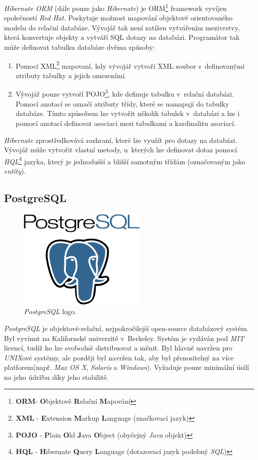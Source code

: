 \emph{Hibernate ORM} (dále pouze jako \emph{Hibernate}) je ORM\footnote{\textbf{ORM}- \textbf{O}bjektově \textbf{R}elační \textbf{M}apování} framework vyvíjen společností \emph{Red Hat}.
Poskytuje možnost mapování objektově orientovaného modelu do relační databáze.
Vývojář tak není zatížen vytvářením mezivrstvy, která konvertuje objekty a vytváří SQL dotazy na databázi.
Programátor tak může definovat tabulku databáze dvěma způsoby:
\begin{enumerate}
  \item Pomocí XML\footnote{\textbf{XML} - \textbf{E}xtension \textbf{M}arkup \textbf{L}anguage (značkovací jazyk)} mapovaní, kdy vývojář vytvoří XML soubor s~definovanými atributy tabulky a jejich omezeními.
  \item Vývojář pouze vytvoří POJO\footnote{\textbf{POJO} - \textbf{P}lain \textbf{O}ld \textbf{J}ava \textbf{O}bject (obyčejný \emph{Java} objekt)}, kde definuje tabulku v~relační databázi. Pomocí anotací se označí atributy třídy, které se namapují do tabulky databáze.
        Tímto způsobem lze vytvořit několik tabulek v~databázi a lze i pomocí anotací definovat asociaci mezi tabulkami a kardinalitu asociací.
\end{enumerate}
\emph{Hibernate} zprostředkovává rozhraní, které lze využít pro dotazy na databázi.
Vývojář může vytvořit vlastní metody, u~kterých lze definovat dotaz pomocí \emph{HQL}\footnote{\textbf{HQL} - \textbf{H}ibernate \textbf{Q}uery \textbf{L}anguage (dotazovací jazyk podobný \emph{SQL})} jazyka,
který je jednodušší a bližší samotným třídám (označovaným jako \emph{entity}).

\subsection*{PostgreSQL}
\label{pouzite:postgresql}
\begin{figure}[hbt]
  \centering
  \includegraphics[width=.2 \linewidth]{obrazky-figures/post.png}
  \caption{\emph{PostgreSQL} logo.~\cite{postgres:tutorial}}
\end{figure}

\emph{PostgreSQL} je objektově-relační, nejpokročilejší open-source databázový systém.
Byl vyvinut na Kalifornské univerzitě v~Berkeley.
Systém je vydáván pod \emph{MIT} licencí, tudíž ho lze svobodně distribuovat a měnit.
Byl hlavně navržen pro \emph{UNIX}ové systémy, ale později byl navržen tak, aby byl přenositelný na více platforem(např. \emph{Max OS X}, \emph{Solaris} a \emph{Windows}).
Vyžaduje pouze minimální úsilí na jeho údržbu díky jeho stabilitě.~\cite{postgres:tutorial}

